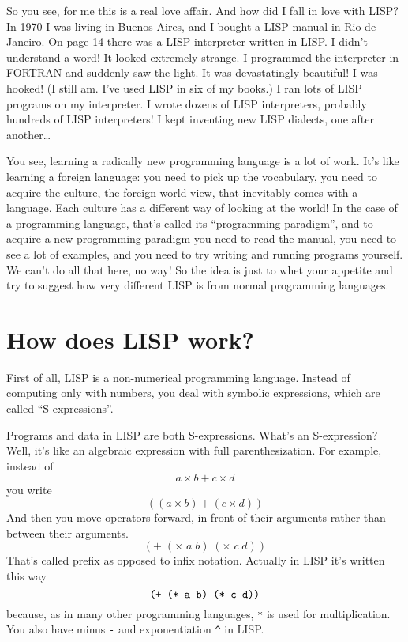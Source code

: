 \documentclass[12pt]{book}
\begin{document}
So you see, for me this is a real love affair.              
And how did I fall in love with LISP?
In 1970 
I was living in Buenos Aires, and I bought a LISP manual
in Rio de Janeiro.
On page 14 there was a LISP interpreter written in LISP.
I didn't understand a word!
It looked extremely strange.
I programmed the interpreter in FORTRAN and suddenly saw the light.
It was devastatingly beautiful!
I was hooked! (I still am. I've used LISP in six of my books.)
I ran lots of LISP programs on my interpreter.
I wrote dozens of LISP interpreters, probably hundreds of LISP interpreters!
I kept inventing new LISP dialects, one after another\ldots
 
You see, learning a radically
new programming language is a lot of work.
It's like learning a foreign language: you need to pick up the vocabulary,
you need to acquire the culture, 
the foreign world-view, that inevitably comes with a language.
Each culture has a different way of looking at the world!
In the case of a programming language,
that's called its ``programming paradigm'', and to acquire a new programming paradigm
you need to read the manual, you need to see a lot of examples,
and you need to try writing and running programs yourself.
We can't do all that here, no way!  So the idea is just to whet
your appetite and try to suggest how very different LISP is from normal
programming languages.

\section*{How does LISP work?}

First of all, LISP is a non-numerical programming language. 
Instead of computing only with numbers,
you deal
with symbolic expressions, which are called ``S-expressions''.
 
Programs and data in LISP are both S-expressions.
What's an S-expression? Well, it's like an algebraic expression
with full parenthesization. For example, instead of
\[
 a \times b + c \times d
\] 
you write
\[
 ((a \times b) + (c \times d))
\] 
And then you move operators forward, 
in front of their arguments rather than between their arguments. 
\[
 (+ \; (\times \; a \; b) \; (\times \; c \; d))
\] 
That's called prefix as opposed to infix notation.
Actually in LISP it's written this way
\[\mbox{\texttt{
 (+ (* a b) (* c d))
}}\]
because, as in many other programming languages, \texttt{*} is used for multiplication. 
You also have minus \texttt{-} and exponentiation \verb|^| in LISP.
 
\end{document}
